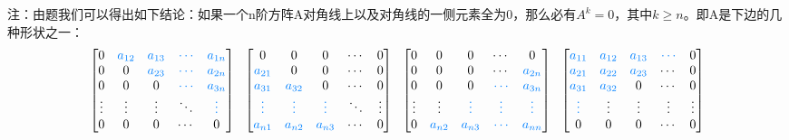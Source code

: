 \documentclass{article}
\begin{document}
\begin{jie}
\textcolor[rgb]{1.00,0.00,0.00}{注：由题我们可以得出如下结论：如果一个n阶方阵A对角线上以及对角线的一侧元素全为0，那么必有$A^{k}=0$，其中$k\geq n$。即A是下边的几种形状之一：
\begin{equation*}
\begin{bmatrix}
  0 &\textcolor[rgb]{0.00,0.50,1.00}{ a_{12}}&\textcolor[rgb]{0.00,0.50,1.00}{a_{13}}&\textcolor[rgb]{0.00,0.50,1.00}{\cdots}&\textcolor[rgb]{0.00,0.50,1.00}{a_{1n}} \\
  0& 0&\textcolor[rgb]{0.00,0.50,1.00}{a_{23}}&\textcolor[rgb]{0.00,0.50,1.00}{\cdots}&\textcolor[rgb]{0.00,0.50,1.00}{a_{2n}}\\
   0&0&0&\textcolor[rgb]{0.00,0.50,1.00}{\cdots}&\textcolor[rgb]{0.00,0.50,1.00}{a_{3n}}\\
  \vdots&\vdots&\vdots&\ddots&\textcolor[rgb]{0.00,0.50,1.00}{\vdots}\\
  0&0&0&\cdots&0
\end{bmatrix}
~~
\begin{bmatrix}
  0 & 0&0&\cdots&0 \\
  \textcolor[rgb]{0.00,0.50,1.00}{a_{21}}& 0&0&\cdots&0\\
   \textcolor[rgb]{0.00,0.50,1.00}{a_{31}}&\textcolor[rgb]{0.00,0.50,1.00}{a_{32}}&0&\cdots&0\\
  \textcolor[rgb]{0.00,0.50,1.00}{\vdots}&\textcolor[rgb]{0.00,0.50,1.00}{\vdots}&\textcolor[rgb]{0.00,0.50,1.00}{\vdots}&\ddots&\vdots\\
  \textcolor[rgb]{0.00,0.50,1.00}{a_{n1}}&\textcolor[rgb]{0.00,0.50,1.00}{a_{n2}}&\textcolor[rgb]{0.00,0.50,1.00}{a_{n3}}&\cdots&0
\end{bmatrix}
~~
\begin{bmatrix}
  0 & 0&0&\cdots&0 \\
 0& 0&0&\cdots&\textcolor[rgb]{0.00,0.50,1.00}{a_{2n}}\\
   0&0&0&\textcolor[rgb]{0.00,0.50,1.00}{\cdots}&\textcolor[rgb]{0.00,0.50,1.00}{a_{3n}}\\
  \vdots&\vdots&\textcolor[rgb]{0.00,0.50,1.00}{\vdots}&\textcolor[rgb]{0.00,0.50,1.00}{\vdots}&\textcolor[rgb]{0.00,0.50,1.00}{\vdots}\\
  0&\textcolor[rgb]{0.00,0.50,1.00}{a_{n2}}&\textcolor[rgb]{0.00,0.50,1.00}{a_{n3}}&\textcolor[rgb]{0.00,0.50,1.00}{\cdots}&\textcolor[rgb]{0.00,0.50,1.00}{a_{nn}}
\end{bmatrix}
~~
\begin{bmatrix}
 \textcolor[rgb]{0.00,0.50,1.00}{ a_{11}} & \textcolor[rgb]{0.00,0.50,1.00}{a_{12}}&\textcolor[rgb]{0.00,0.50,1.00}{a_{13}}&\textcolor[rgb]{0.00,0.50,1.00}{\cdots}&0 \\
 \textcolor[rgb]{0.00,0.50,1.00}{a_{21}}& \textcolor[rgb]{0.00,0.50,1.00}{a_{22}}&\textcolor[rgb]{0.00,0.50,1.00}{a_{23}}&\cdots&0\\
  \textcolor[rgb]{0.00,0.50,1.00}{ a_{31}}&\textcolor[rgb]{0.00,0.50,1.00}{a_{32}}&0&\cdots&0\\
  \textcolor[rgb]{0.00,0.50,1.00}{\vdots}&\vdots&\vdots&\vdots&\vdots\\
  0&0&0&\cdots&0
\end{bmatrix}
\end{equation*}
}
\end{jie}
\end{document}
